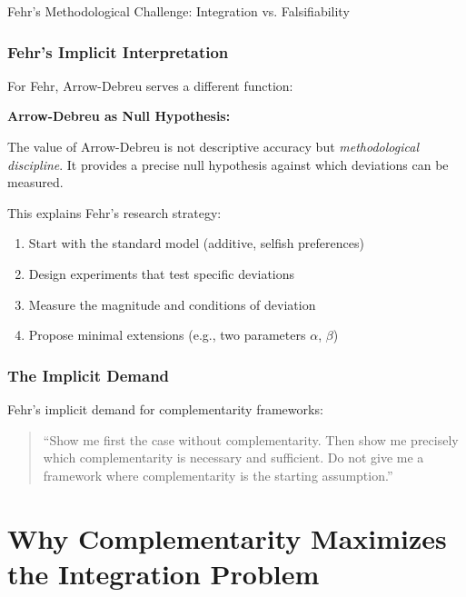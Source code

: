 \begin{chapter}{Fehr's Methodological Challenge: Integration vs. Falsifiability}
\subsubsection{Fehr's Implicit Interpretation}

For Fehr, Arrow-Debreu serves a different function:

\begin{tcolorbox}[colback=blue!5!white,colframe=blue!75!black]
\textbf{Arrow-Debreu as Null Hypothesis:}

The value of Arrow-Debreu is not descriptive accuracy but \textit{methodological discipline}. It provides a precise null hypothesis against which deviations can be measured.
\end{tcolorbox}

This explains Fehr's research strategy:
\begin{enumerate}
    \item Start with the standard model (additive, selfish preferences)
    \item Design experiments that test specific deviations
    \item Measure the magnitude and conditions of deviation
    \item Propose minimal extensions (e.g., two parameters $\alpha$, $\beta$)
\end{enumerate}

\subsubsection{The Implicit Demand}

Fehr's implicit demand for complementarity frameworks:

\begin{quote}
``Show me first the case without complementarity. Then show me precisely which complementarity is necessary and sufficient. Do not give me a framework where complementarity is the starting assumption.''
\end{quote}


\section{Why Complementarity Maximizes the Integration Problem}
\label{sec:complementarity-threat}


\end{chapter}
